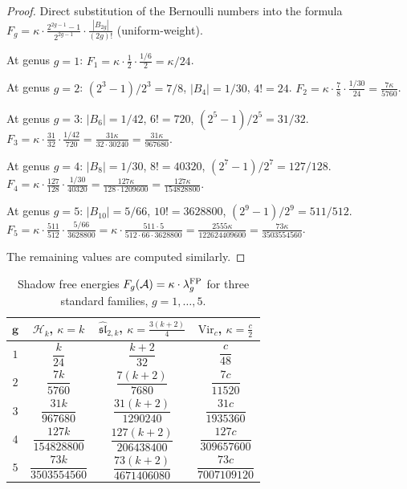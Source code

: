 \begin{proof}
Direct substitution of the Bernoulli numbers into the
formula
$F_g = \kappa \cdot \frac{2^{2g-1}-1}{2^{2g-1}} \cdot \frac{|B_{2g}|}{(2g)!}$
\textup{(}uniform-weight\textup{)}.

At genus $g = 1$: $F_1 = \kappa \cdot \frac{1}{2} \cdot \frac{1/6}{2} = \kappa/24$.

At genus $g = 2$: $(2^3{-}1)/2^3 = 7/8$, $|B_4| = 1/30$, $4! = 24$. $F_2 = \kappa \cdot \frac{7}{8} \cdot \frac{1/30}{24} = \frac{7\kappa}{5760}$.

At genus $g = 3$: $|B_6| = 1/42$, $6! = 720$, $(2^5 - 1)/2^5 = 31/32$. $F_3 = \kappa \cdot \frac{31}{32} \cdot \frac{1/42}{720} = \frac{31\kappa}{32 \cdot 30240} = \frac{31\kappa}{967680}$.

At genus $g = 4$: $|B_8| = 1/30$, $8! = 40320$, $(2^7 - 1)/2^7 = 127/128$. $F_4 = \kappa \cdot \frac{127}{128} \cdot \frac{1/30}{40320} = \frac{127\kappa}{128 \cdot 1209600} = \frac{127\kappa}{154828800}$.

At genus $g = 5$: $|B_{10}| = 5/66$, $10! = 3628800$, $(2^9 - 1)/2^9 = 511/512$. $F_5 = \kappa \cdot \frac{511}{512} \cdot \frac{5/66}{3628800} = \kappa \cdot \frac{511 \cdot 5}{512 \cdot 66 \cdot 3628800} = \frac{2555\kappa}{122624409600} = \frac{73\kappa}{3503554560}$.

The remaining values are computed similarly.
\end{proof}

\begin{table}[ht]
\centering
\caption{Shadow free energies $F_g(\mathcal{A}) = \kappa \cdot \lambda_g^{\mathrm{FP}}$ for three standard families, $g = 1, \ldots, 5$.}
\renewcommand{\arraystretch}{1.5}
{\footnotesize
\begin{tabular}{|c|c|c|c|}
\hline
$\boldsymbol{g}$ & $\mathcal{H}_k$, $\kappa = k$ & $\widehat{\mathfrak{sl}}_{2,k}$, $\kappa = \frac{3(k+2)}{4}$ & $\mathrm{Vir}_c$, $\kappa = \frac{c}{2}$ \\
\hline
$1$ & $\dfrac{k}{24}$ & $\dfrac{k+2}{32}$ & $\dfrac{c}{48}$ \\[6pt]
\hline
$2$ & $\dfrac{7k}{5760}$ & $\dfrac{7(k+2)}{7680}$ & $\dfrac{7c}{11520}$ \\[6pt]
\hline
$3$ & $\dfrac{31k}{967680}$ & $\dfrac{31(k+2)}{1290240}$ & $\dfrac{31c}{1935360}$ \\[6pt]
\hline
$4$ & $\dfrac{127k}{154828800}$ & $\dfrac{127(k+2)}{206438400}$ & $\dfrac{127c}{309657600}$ \\[6pt]
\hline
$5$ & $\dfrac{73k}{3503554560}$ & $\dfrac{73(k+2)}{4671406080}$ & $\dfrac{73c}{7007109120}$ \\[6pt]
\hline
\end{tabular}}
\end{table}

